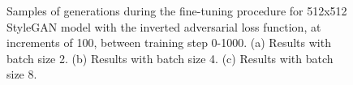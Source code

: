   \begin{figure}[!htbp]
    \centering
    \hfill
    \hfill
    \caption[Samples of generations during the fine-tuning procedure for 512x512 StyleGAN model with the inverted adversarial loss function]{Samples of generations during the fine-tuning procedure for 512x512 StyleGAN model with the inverted adversarial loss function, at increments of 100, between training step 0-1000. (a) Results with batch size 2. (b) Results with batch size 4. (c) Results with batch size 8.}
    \label{fig:c4:512-OG-samples}
  \end{figure}


